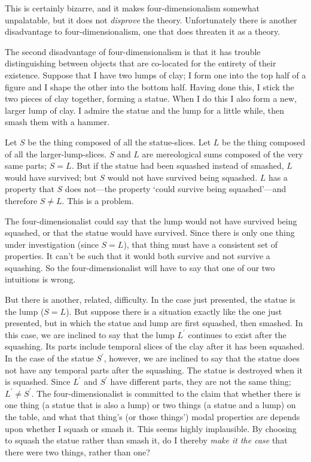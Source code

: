 \documentclass[11pt]{article}
\begin{document}
\begin{spacing}{1.5}
This is certainly bizarre, and it makes four-dimensionalism somewhat
unpalatable, but it does not {\em disprove} the theory.  Unfortunately
there is another disadvantage to four-dimensionalism, one that does
threaten it as a theory.

The second disadvantage of four-dimensionalism is that it has trouble
distinguishing between objects that are co-located for the entirety of
their existence.  Suppose that I have two lumps of clay; I form one
into the top half of a figure and I shape the other into the bottom
half.  Having done this, I stick the two pieces of clay together,
forming a statue.  When I do this I also form a new, larger lump of
clay.  I admire the statue and the lump for a little while, then smash
them with a hammer.

Let $S$ be the thing composed of all the statue-slices.  Let $L$ be
the thing composed of all the larger-lump-slices.  $S$ and $L$ are
mereological sums composed of the very same parts; $S = L$.  But if
the statue had been squashed instead of smashed, $L$ would have
survived; but $S$ would not have survived being squashed.  $L$ has a
property that $S$ does not---the property `could survive being
squashed'---and therefore $S \neq L$.  This is a problem.

The four-dimensionalist could say that the lump would not have
survived being squashed, or that the statue would have survived.
Since there is only one thing under investigation (since $S = L$),
that thing must have a consistent set of properties.  It can't be such
that it would both survive and not survive a squashing.  So the
four-dimensionalist will have to say that one of our two intuitions is
wrong.

But there is another, related, difficulty.  In the case just
presented, the statue is the lump ($S = L$).  But suppose there is a
situation exactly like the one just presented, but in which the statue
and lump are first squashed, then smashed.  In this case, we are
inclined to say that the lump $L^{\prime}$ continues to exist after
the squashing.  Its parts include temporal slices of the clay after it
has been squashed.  In the case of the statue $S^{\prime}$, however,
we are inclined to say that the statue does not have any temporal
parts after the squashing.  The statue is destroyed when it is
squashed.  Since $L^{\prime}$ and $S^{\prime}$ have different parts,
they are not the same thing; $L^{\prime} \neq S^{\prime}$.  The
four-dimensionalist is committed to the claim that whether there is
one thing (a statue that is also a lump) or two things (a statue and a
lump) on the table, and what that thing's (or those things') modal
properties are depends upon whether I squash or smash it.  This seems
highly implausible.  By choosing to squash the statue rather than
smash it, do I thereby {\em make it the case} that there were two
things, rather than one?


\end{spacing}
\end{document}
